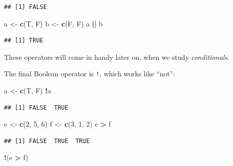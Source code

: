 \documentclass[]{book}
\makeatletter
\newenvironment{Shaded}{\begin{snugshade}}{\end{snugshade}}
\newcommand{\KeywordTok}[1]{\textcolor[rgb]{0.13,0.29,0.53}{\textbf{#1}}}
\newcommand{\DecValTok}[1]{\textcolor[rgb]{0.00,0.00,0.81}{#1}}
\newcommand{\StringTok}[1]{\textcolor[rgb]{0.31,0.60,0.02}{#1}}
\newcommand{\OperatorTok}[1]{\textcolor[rgb]{0.81,0.36,0.00}{\textbf{#1}}}
\newcommand{\NormalTok}[1]{#1}
\newenvironment{kframe}{%
\medskip{}
\setlength{\fboxsep}{.8em}
 \def\at@end@of@kframe{}%
 \ifinner\ifhmode%
  \def\at@end@of@kframe{\end{minipage}}%
  \begin{minipage}{\columnwidth}%
 \fi\fi%
 \def\FrameCommand##1{\hskip\@totalleftmargin \hskip-\fboxsep
 \colorbox{shadecolor}{##1}\hskip-\fboxsep
     \hskip-\linewidth \hskip-\@totalleftmargin \hskip\columnwidth}%
 \MakeFramed {\advance\hsize-\width
   \@totalleftmargin\z@ \linewidth\hsize
   \@setminipage}}%
 {\par\unskip\endMakeFramed%
 \at@end@of@kframe}
\renewenvironment{Shaded}{\begin{kframe}}{\end{kframe}}
\theoremstyle{definition}
\theoremstyle{definition}
\theoremstyle{definition}
\theoremstyle{remark}
\makeatother
\begin{document}
\begin{verbatim}
## [1] FALSE
\end{verbatim}

\begin{Shaded}
\begin{Highlighting}[]
\NormalTok{a <-}\StringTok{ }\KeywordTok{c}\NormalTok{(T, F)}
\NormalTok{b <-}\StringTok{ }\KeywordTok{c}\NormalTok{(F, F)}
\NormalTok{a }\OperatorTok{||}\StringTok{ }\NormalTok{b}
\end{Highlighting}
\end{Shaded}

\begin{verbatim}
## [1] TRUE
\end{verbatim}

These operators will come in handy later on, when we study
\emph{conditionals}.

The final Boolean operator is \texttt{!}, which works like ``not'':

\begin{Shaded}
\begin{Highlighting}[]
\NormalTok{a <-}\StringTok{ }\KeywordTok{c}\NormalTok{(T, F)}
\OperatorTok{!}\NormalTok{a}
\end{Highlighting}
\end{Shaded}

\begin{verbatim}
## [1] FALSE  TRUE
\end{verbatim}

\begin{Shaded}
\begin{Highlighting}[]
\NormalTok{e <-}\StringTok{ }\KeywordTok{c}\NormalTok{(}\DecValTok{2}\NormalTok{, }\DecValTok{5}\NormalTok{, }\DecValTok{6}\NormalTok{)}
\NormalTok{f <-}\StringTok{  }\KeywordTok{c}\NormalTok{(}\DecValTok{3}\NormalTok{, }\DecValTok{1}\NormalTok{, }\DecValTok{2}\NormalTok{)}
\NormalTok{e }\OperatorTok{>}\StringTok{ }\NormalTok{f}
\end{Highlighting}
\end{Shaded}

\begin{verbatim}
## [1] FALSE  TRUE  TRUE
\end{verbatim}

\begin{Shaded}
\begin{Highlighting}[]
\OperatorTok{!}\NormalTok{(e }\OperatorTok{>}\StringTok{ }\NormalTok{f)}
\end{Highlighting}
\end{Shaded}
\end{document}
